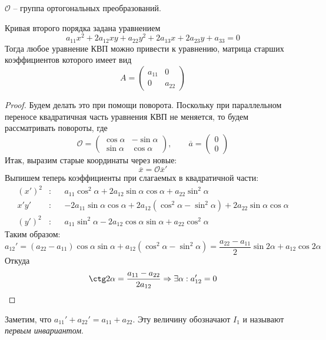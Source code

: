 \begin{notation}
	$\mathcal{O}$ -- группа ортогональных преобразований.
\end{notation}


\begin{Thm}
	Кривая второго порядка задана уравнением
	\[a_{11} x^2 + 2a_{12} xy + a_{22} y^2 + 2a_{13} x + 2a_{23} y + a_{33} = 0\]
	Тогда любое уравнение КВП можно привести к уравнению, матрица старших коэффициентов которого имеет вид
	\[A = \left(\begin{array}{cc}
	a_{11} & 0 \\ 
	0 & a_{22}
	\end{array}\right)\] 
\end{Thm}

\begin{proof}
	Будем делать это при помощи поворота. Поскольку при параллельном переносе квадратичная часть уравнения КВП не меняется, то будем рассматривать повороты, где 
	\[\mathcal{O} = \left(\begin{array}{cc}
	\cos \alpha & -\sin \alpha \\ 
	\sin \alpha & \cos \alpha
	\end{array}\right), \qquad \overline{a} = \left(\begin{array}{c}
	0 \\ 
	0
	\end{array}\right)\]
	Итак, выразим старые координаты через новые:
	\[\overline{x} = \mathcal{O} \overline{x}'\]
	Выпишем теперь коэффициенты при слагаемых в квадратичной части:
	\begin{align*}
		(x')^2 &: &&a_{11} \cos^2 \alpha + 2 a_{12}\sin \alpha \cos \alpha + a_{22} \sin^2 \alpha \\
		x'y' &: &&-2a_{11} \sin \alpha \cos \alpha + 2a_{12} (\cos^2 \alpha - \sin^2 \alpha) + 2a_{22} \sin \alpha \cos \alpha \\
		(y')^2 &: &&a_{11} \sin^2 \alpha - 2a_{12} \cos \alpha \sin \alpha + a_{22} \cos^2 \alpha
	\end{align*}
	Таким образом:
	\[a_{12}' = (a_{22} - a_{11}) \cos \alpha \sin \alpha + a_{12} (\cos^2 \alpha - \sin^2 \alpha) = \frac{a_{22} - a_{11}}{2}\sin 2\alpha + a_{12} \cos 2 \alpha\]
	Откуда
	\[\ctg 2\alpha = \frac{a_{11} - a_{22}}{2a_{12}} \SO \exists \alpha : a_{12}' = 0\]
\end{proof}

\begin{Def}
	Заметим, что $a_{11}' + a_{22}' = a_{11} + a_{22}$.
	Эту величину обозначают $I_1$ и называют \textit{первым инвариантом}. 
\end{Def}

